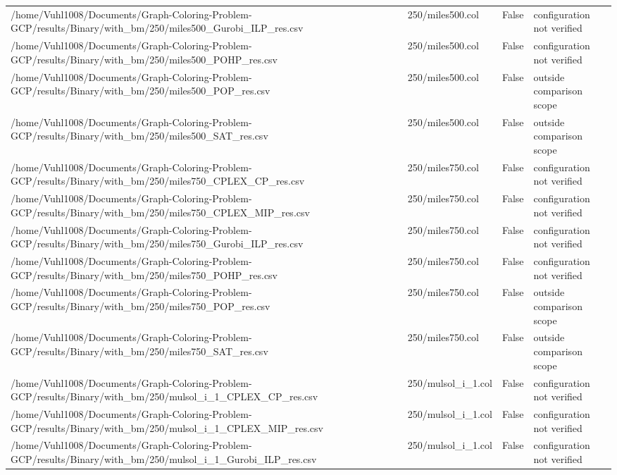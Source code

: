 \begin{table}[htbp]
\begin{tabular}{llll}
/home/Vuhl1008/Documents/Graph-Coloring-Problem-GCP/results/Binary/with\_bm/250/miles500\_Gurobi\_ILP\_res.csv & 250/miles500.col & False & configuration not verified \\
/home/Vuhl1008/Documents/Graph-Coloring-Problem-GCP/results/Binary/with\_bm/250/miles500\_POHP\_res.csv & 250/miles500.col & False & configuration not verified \\
/home/Vuhl1008/Documents/Graph-Coloring-Problem-GCP/results/Binary/with\_bm/250/miles500\_POP\_res.csv & 250/miles500.col & False & outside comparison scope \\
/home/Vuhl1008/Documents/Graph-Coloring-Problem-GCP/results/Binary/with\_bm/250/miles500\_SAT\_res.csv & 250/miles500.col & False & outside comparison scope \\
/home/Vuhl1008/Documents/Graph-Coloring-Problem-GCP/results/Binary/with\_bm/250/miles750\_CPLEX\_CP\_res.csv & 250/miles750.col & False & configuration not verified \\
/home/Vuhl1008/Documents/Graph-Coloring-Problem-GCP/results/Binary/with\_bm/250/miles750\_CPLEX\_MIP\_res.csv & 250/miles750.col & False & configuration not verified \\
/home/Vuhl1008/Documents/Graph-Coloring-Problem-GCP/results/Binary/with\_bm/250/miles750\_Gurobi\_ILP\_res.csv & 250/miles750.col & False & configuration not verified \\
/home/Vuhl1008/Documents/Graph-Coloring-Problem-GCP/results/Binary/with\_bm/250/miles750\_POHP\_res.csv & 250/miles750.col & False & configuration not verified \\
/home/Vuhl1008/Documents/Graph-Coloring-Problem-GCP/results/Binary/with\_bm/250/miles750\_POP\_res.csv & 250/miles750.col & False & outside comparison scope \\
/home/Vuhl1008/Documents/Graph-Coloring-Problem-GCP/results/Binary/with\_bm/250/miles750\_SAT\_res.csv & 250/miles750.col & False & outside comparison scope \\
/home/Vuhl1008/Documents/Graph-Coloring-Problem-GCP/results/Binary/with\_bm/250/mulsol\_i\_1\_CPLEX\_CP\_res.csv & 250/mulsol\_i\_1.col & False & configuration not verified \\
/home/Vuhl1008/Documents/Graph-Coloring-Problem-GCP/results/Binary/with\_bm/250/mulsol\_i\_1\_CPLEX\_MIP\_res.csv & 250/mulsol\_i\_1.col & False & configuration not verified \\
/home/Vuhl1008/Documents/Graph-Coloring-Problem-GCP/results/Binary/with\_bm/250/mulsol\_i\_1\_Gurobi\_ILP\_res.csv & 250/mulsol\_i\_1.col & False & configuration not verified \\

\end{tabular}
\end{table}
